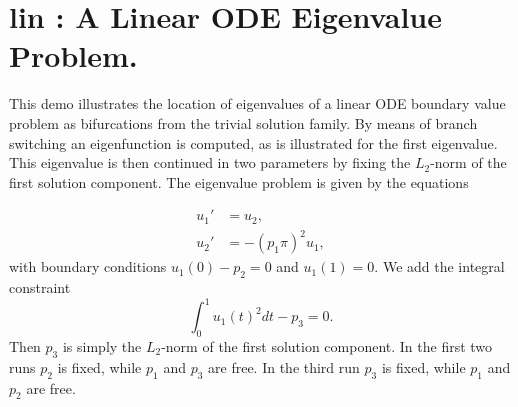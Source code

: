 \documentclass[12pt]{report}
\begin{document}
\newpage
\section{ lin : A Linear ODE Eigenvalue Problem.} \label{sec:Demos_lin}
This demo illustrates the location of eigenvalues of a linear ODE
boundary value problem as bifurcations from the trivial solution family.
By means of branch switching an eigenfunction is computed,
as is illustrated for the first eigenvalue. 
This eigenvalue is then continued in two parameters
by fixing the $L_2$-norm of the first solution component.
The eigenvalue problem is given by the equations

\begin{equation} \begin{array}{cl}
  u_1 ' &= u_2  ,  \\
  u_2 ' &=-(p_1 \pi)^{2} u_1 , \end{array} \end{equation}
with boundary conditions $ u_1(0)-p_2=0 $ and $  u_1(1)=0.$
We add the integral constraint
 $$ \int_0^{1} u_1(t)^{2} dt - p_3 = 0. $$
Then $p_3$ is simply the $L_2$-norm of the first solution component.
In the first two runs $p_2$ is fixed, while $p_1$ and $p_3$ are free.
In the third run  $p_3$ is fixed, while $p_1$ and $p_2$ are free.
\end{document}
